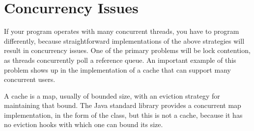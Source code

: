 \section{Concurrency Issues}
\label{sec:lifetime-management-concurrency-issues}

If your program operates with many concurrent threads, you have to program
differently, because straightforward implementations of the above strategies will
result in concurrency issues. One of the primary problems will be lock
contention, as threads concurrently poll a reference queue. An important example
of this problem shows up in the implementation of a cache that can support many
concurrent users.

A cache is a map, usually of bounded size, with an eviction strategy for
maintaining that bound. The Java standard library provides a
concurrent map implementation, in the form of the 
class, but this is not a cache, because it has no eviction hooks with which one
can bound its size.

